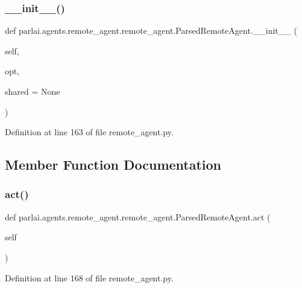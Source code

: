 \subsubsection{\texorpdfstring{\+\_\+\+\_\+init\+\_\+\+\_\+()}{\_\_init\_\_()}}
{\footnotesize\ttfamily def parlai.\+agents.\+remote\+\_\+agent.\+remote\+\_\+agent.\+Parsed\+Remote\+Agent.\+\_\+\+\_\+init\+\_\+\+\_\+ (\begin{DoxyParamCaption}\item[{}]{self,  }\item[{}]{opt,  }\item[{}]{shared = {\ttfamily None} }\end{DoxyParamCaption})}



Definition at line 163 of file remote\+\_\+agent.\+py.



\subsection{Member Function Documentation}
\mbox{\label{classparlai_1_1agents_1_1remote__agent_1_1remote__agent_1_1ParsedRemoteAgent_a7eb6a8cdcffb425506e085c4bef07a85}} 
\subsubsection{\texorpdfstring{act()}{act()}}
{\footnotesize\ttfamily def parlai.\+agents.\+remote\+\_\+agent.\+remote\+\_\+agent.\+Parsed\+Remote\+Agent.\+act (\begin{DoxyParamCaption}\item[{}]{self }\end{DoxyParamCaption})}



Definition at line 168 of file remote\+\_\+agent.\+py.




